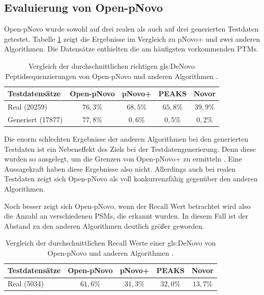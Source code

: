 \documentclass[a4paper, 12pt]{article}
\newcommand{\dashAndSpace}{\textendash \space}
\begin{document}
\subsection{Evaluierung von Open-pNovo}
Open-pNovo wurde sowohl auf drei realen als auch auf drei generierten Testdaten getestet. Tabelle \ref{tab:OpenPNovoResults} zeigt die Ergebnisse im Vergleich zu pNovo+ und zwei anderen Algorithmen. Die Datensätze enthielten die am häufigsten vorkommenden PTMs.

\begin{table}[H]
    \centering
    \begin{tabular}{l|c|c|c|c}
        \toprule
        \textbf{Testdatensätze} & \textbf{Open-pNovo} & \textbf{pNovo+} & \textbf{PEAKS} & \textbf{Novor} \\
        \midrule
        Real (20259) & $76,3 \%$ & $68,5 \%$ & $65,8 \%$ & $39,9 \%$ \\
        Generiert (17877) & $77,8 \%$ & $0,6 \%$ & $0,5 \%$ & $0,2 \%$ \\
        \bottomrule
    \end{tabular}
    \newline
    \caption{Vergleich der durchschnittlichen richtigen \gls{gls:DeNovo} Peptidsequenzierungen von Open-pNovo und anderen Algorithmen \cite[650]{OpenPNovo}.}
    \label{tab:OpenPNovoResults}
\end{table}

Die enorm schlechten Ergebnisse der anderen Algorithmen bei den generierten Testdaten ist ein Nebeneffekt des Ziels bei der Testdatengenerierung. Denn diese wurden so ausgelegt, um die Grenzen von Open-pNovo+ zu ermitteln \cite[649]{OpenPNovo}. Eine Aussagekraft haben diese Ergebnisse also nicht. Allerdings auch bei realen Testdaten zeigt sich Open-pNovo als voll konkurrenzfähig gegenüber den anderen Algorithmen.

Noch besser zeigt sich Open-pNovo, wenn der Recall Wert betrachtet wird \dashAndSpace also die Anzahl an verschiedenen PSMs, die erkannt wurden. In diesem Fall ist der Abstand zu den anderen Algorithmen deutlich größer geworden.

\begin{table}[H]
    \centering
    \begin{tabular}{l|c|c|c|c}
        \toprule
        \textbf{Testdatensätze} & \textbf{Open-pNovo} & \textbf{pNovo+} & \textbf{PEAKS} & \textbf{Novor} \\
        \midrule
        Real (5034) & $61,6 \%$ & $31,3 \%$ & $32,0 \%$ & $13,7 \%$ \\
        \bottomrule
    \end{tabular}
    \newline
    \caption{Vergleich der durchschnittlichen Recall Werte einer \gls{gls:DeNovo} von Open-pNovo und anderen Algorithmen \cite[650]{OpenPNovo}.}
    \label{tab:OpenPNovoResultsRecall}
\end{table}
\end{document}
